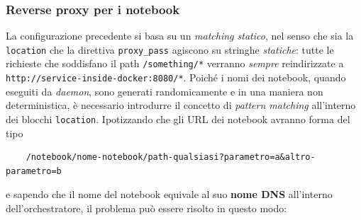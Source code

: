 \subsubsection{Reverse proxy per i notebook}
La configurazione precedente si basa su un \textit{matching statico}, nel senso che sia la \verb|location| che la direttiva \verb|proxy_pass| agiscono su stringhe \textit{statiche}: tutte le richieste che soddisfano il path \verb|/something/*| verranno \textit{sempre} reindirizzate a \newline\verb|http://service-inside-docker:8080/*|.\newline
Poiché i nomi dei notebook, quando eseguiti da \textit{daemon}, sono generati randomicamente e in una maniera non deterministica, è necessario introdurre il concetto di \textit{pattern matching} all'interno dei blocchi \verb|location|.\newline
Ipotizzando che gli URL dei notebook avranno forma del tipo
\begin{verbatim}
    /notebook/nome-notebook/path-qualsiasi?parametro=a&altro-parametro=b
\end{verbatim}
e sapendo che il nome del notebook equivale al suo \textbf{nome DNS} all'interno dell'orchestratore, il problema può essere risolto in questo modo:

